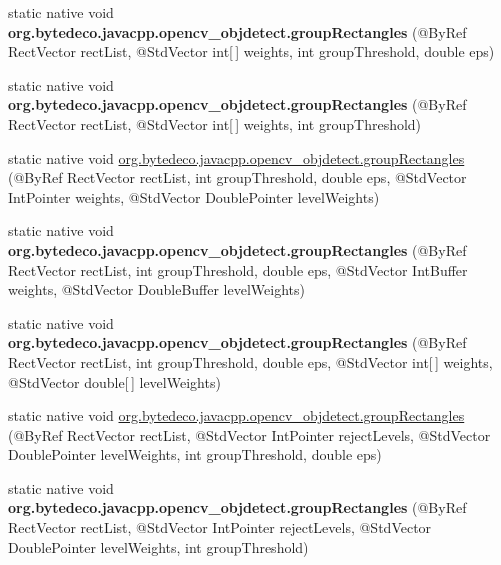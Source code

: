 \begin{DoxyCompactItemize}
static native void {\bfseries org.\+bytedeco.\+javacpp.\+opencv\+\_\+objdetect.\+group\+Rectangles} (@By\+Ref Rect\+Vector rect\+List, @Std\+Vector int\mbox{[}$\,$\mbox{]} weights, int group\+Threshold, double eps)
\item 
\mbox{\label{group__objdetect_ga2cbeb57740e7aedf0689fa5cb166ee9c}} 
static native void {\bfseries org.\+bytedeco.\+javacpp.\+opencv\+\_\+objdetect.\+group\+Rectangles} (@By\+Ref Rect\+Vector rect\+List, @Std\+Vector int\mbox{[}$\,$\mbox{]} weights, int group\+Threshold)
\item 
static native void \hyperlink{group__objdetect_ga48da69f02f512561ce6524dfe4508d0d}{org.\+bytedeco.\+javacpp.\+opencv\+\_\+objdetect.\+group\+Rectangles} (@By\+Ref Rect\+Vector rect\+List, int group\+Threshold, double eps, @Std\+Vector Int\+Pointer weights, @Std\+Vector Double\+Pointer level\+Weights)
\item 
\mbox{\label{group__objdetect_gaa4ac594926bd4a783b6b3da98fd3e20d}} 
static native void {\bfseries org.\+bytedeco.\+javacpp.\+opencv\+\_\+objdetect.\+group\+Rectangles} (@By\+Ref Rect\+Vector rect\+List, int group\+Threshold, double eps, @Std\+Vector Int\+Buffer weights, @Std\+Vector Double\+Buffer level\+Weights)
\item 
\mbox{\label{group__objdetect_ga21c96b691541e2d04b5d1055c9548c30}} 
static native void {\bfseries org.\+bytedeco.\+javacpp.\+opencv\+\_\+objdetect.\+group\+Rectangles} (@By\+Ref Rect\+Vector rect\+List, int group\+Threshold, double eps, @Std\+Vector int\mbox{[}$\,$\mbox{]} weights, @Std\+Vector double\mbox{[}$\,$\mbox{]} level\+Weights)
\item 
static native void \hyperlink{group__objdetect_ga0a844bdf309e1f0b6a11e2622edf3548}{org.\+bytedeco.\+javacpp.\+opencv\+\_\+objdetect.\+group\+Rectangles} (@By\+Ref Rect\+Vector rect\+List, @Std\+Vector Int\+Pointer reject\+Levels, @Std\+Vector Double\+Pointer level\+Weights, int group\+Threshold, double eps)
\item 
\mbox{\label{group__objdetect_ga1db46626719612cf533b0f84486b76f3}} 
static native void {\bfseries org.\+bytedeco.\+javacpp.\+opencv\+\_\+objdetect.\+group\+Rectangles} (@By\+Ref Rect\+Vector rect\+List, @Std\+Vector Int\+Pointer reject\+Levels, @Std\+Vector Double\+Pointer level\+Weights, int group\+Threshold)

\end{DoxyCompactItemize}
